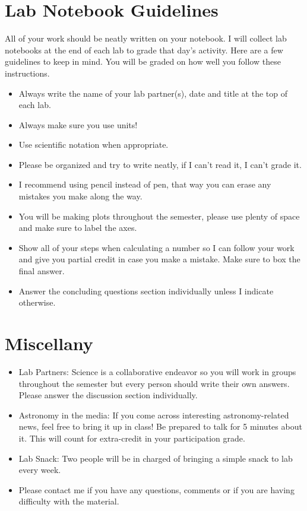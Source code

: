 \documentclass[11pt]{article}
\begin{document}
\begin{flushleft}
\section*{Lab Notebook Guidelines}
All of your work should be neatly written on your notebook.  I will collect lab notebooks at the end of each lab to grade that day's activity.
Here are a few guidelines to keep in mind.  You will be graded on how well you follow these instructions.
\begin{itemize}
\item Always write the name of your lab partner(s), date and title at the top of each lab.
\item Always make sure you use units! 
\item Use scientific notation when appropriate. 
\item Please be organized and try to write neatly, if I can't read it, I can't grade it.
\item I recommend using pencil instead of pen, that way you can erase any mistakes you make along the way.
\item You will be making plots throughout the semester, please use plenty of space and make sure to label the axes.
\item Show all of your steps when calculating a number so I can follow your work and give you partial credit in case you make a mistake.  Make sure to box the final answer. 
\item Answer the concluding questions section individually unless I indicate otherwise.
\end{itemize}

\section*{Miscellany}
\begin{itemize}

\vspace{0.1in}
\item Lab Partners:  Science is a collaborative endeavor so you will work in groups throughout the semester but every person should write their own answers.  Please answer the discussion section individually. 
\item Astronomy in the media: If you come across interesting astronomy-related news, feel free to bring it up in class! Be prepared to talk for 5 minutes about it. This will count for extra-credit in your participation grade. 
\item Lab Snack:  Two people will be in charged of bringing a simple snack to lab every week.
\item Please contact me if you have any questions, comments or if you are having difficulty with the material. 
\end{itemize}


\end{flushleft}
\end{document}
